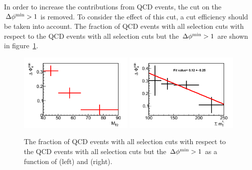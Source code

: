 In order to increase the contributions from QCD events, the cut on the $\,{\Delta\phi^{\rm min}}>1$ is removed.
To consider the effect of this cut, a cut efficiency should be taken into account. The 
fraction of QCD events with all selection cuts with respect to the QCD events with all selection 
cuts but the $\,{\Delta\phi^{\rm min}}>1$ are shown in figure~\ref{fig:3QCDbg}.\\
\begin{figure}[!Hhtb]
\centering
\includegraphics[width=0.49\textwidth]{QCDbginTauTau/Bin1_miscefficiency.png}
\includegraphics[width=0.49\textwidth]{QCDbginTauTau/Bin2_miscefficiency.png} \\
\caption{ The fraction of QCD events with all selection cuts with respect to the QCD events with all selection 
cuts but the $\,{\Delta\phi^{\rm min}}>1$ as a function of \mttwo (left) and \SumMT (right).}
\label{fig:3QCDbg}
\end{figure}

